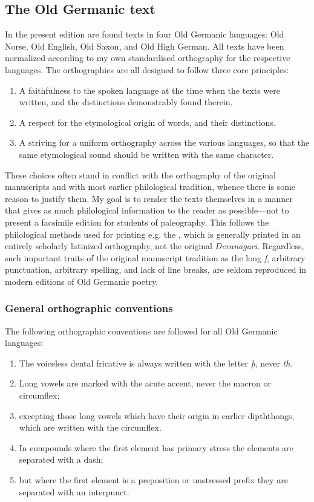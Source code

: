   \subsection{The Old Germanic text}

    In the present edition are found texts in four Old Germanic languages: Old Norse, Old English, Old Saxon, and Old High German.  All texts have been normalized according to my own standardised orthography for the respective languages. The orthographies are all designed to follow three core principles:

    \begin{enumerate}
      \item A faithfulness to the spoken language at the time when the texts were written, and the distinctions demonstrably found therein.
      \item A respect for the etymological origin of words, and their distinctions.
      \item A striving for a uniform orthography across the various languages, so that the same etymological sound should be written with the same character.
    \end{enumerate}

    These choices often stand in conflict with the orthography of the original manuscripts and with most earlier philological tradition, whence there is some reason to justify them.  My goal is to render the texts themselves in a manner that gives as much philological information to the reader as possible—not to present a facsimile edition for students of paleography.  This follows the philological methods used for printing e.g. the \Rigveda, which is generally printed in an entirely scholarly latinized orthography, not the original \emph{Devanāgarī}.  Regardless, such important traits of the original manuscript tradition as the long \emph{ſ}, arbitrary punctuation, arbitrary spelling, and lack of line breaks, are seldom reproduced in modern editions of Old Germanic poetry.

    \subsubsection{General orthographic conventions}

    The following orthographic conventions are followed for all Old Germanic languages:

    \begin{enumerate}
    \item The voiceless dental fricative is always written with the letter \emph{þ}, never \emph{th}.
    \item Long vowels are marked with the acute accent, never the macron or circumflex;
    \item excepting those long vowels which have their origin in earlier dipththongs, which are written with the circumflex.
    \item In compounds where the first element has primary stress the elements are separated with a dash;
    \item but where the first element is a preposition or unstressed prefix they are separated with an interpunct.
    \end{enumerate}

